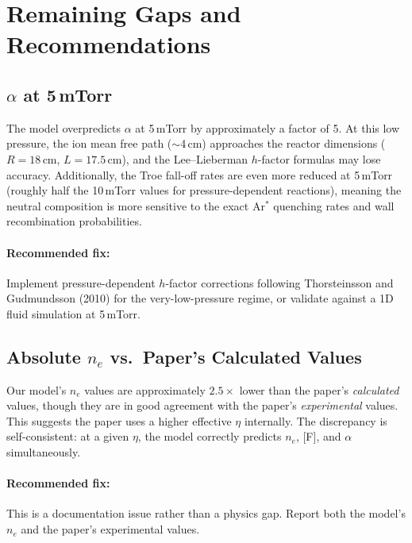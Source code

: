 \documentclass[11pt,a4paper]{article}
\newcommand{\ne}{n_e}
\begin{document}
\section{Remaining Gaps and Recommendations}

\subsection{$\alpha$ at 5\,mTorr}

The model overpredicts $\alpha$ at 5\,mTorr by approximately a factor of 5.  At this low pressure, the ion mean free path ($\sim$4\,cm) approaches the reactor dimensions ($R = 18$\,cm, $L = 17.5$\,cm), and the Lee--Lieberman $h$-factor formulas may lose accuracy.  Additionally, the Troe fall-off rates are even more reduced at 5\,mTorr (roughly half the 10\,mTorr values for pressure-dependent reactions), meaning the neutral composition is more sensitive to the exact Ar$^*$ quenching rates and wall recombination probabilities.

\paragraph{Recommended fix:} Implement pressure-dependent $h$-factor corrections following Thorsteinsson and Gudmundsson (2010) for the very-low-pressure regime, or validate against a 1D fluid simulation at 5\,mTorr.

\subsection{Absolute $\ne$ vs.\ Paper's Calculated Values}

Our model's $\ne$ values are approximately $2.5\times$ lower than the paper's \emph{calculated} values, though they are in good agreement with the paper's \emph{experimental} values.  This suggests the paper uses a higher effective $\eta$ internally.  The discrepancy is self-consistent: at a given $\eta$, the model correctly predicts $\ne$, [F], and $\alpha$ simultaneously.

\paragraph{Recommended fix:} This is a documentation issue rather than a physics gap.  Report both the model's $\ne$ and the paper's experimental values.
\end{document}
